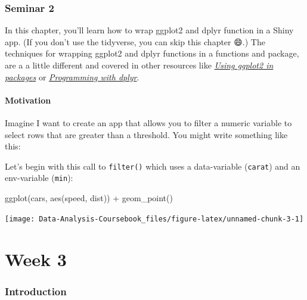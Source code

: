 \documentclass[
]{article}
\newenvironment{Shaded}{\begin{snugshade}}{\end{snugshade}}
\newcommand{\FunctionTok}[1]{\textcolor[rgb]{0.00,0.00,0.00}{#1}}
\newcommand{\NormalTok}[1]{#1}
\newcommand{\SpecialCharTok}[1]{\textcolor[rgb]{0.00,0.00,0.00}{#1}}
\begin{document}
\hypertarget{seminar2}{%
\section{Seminar 2}\label{seminar2}}

In this chapter, you'll learn how to wrap ggplot2 and dplyr function in a Shiny app.
(If you don't use the tidyverse, you can skip this chapter 😄.) The techniques for wrapping ggplot2 and dplyr functions in a functions and package, are a a little different and covered in other resources like \href{http://ggplot2.tidyverse.org/dev/articles/ggplot2-in-packages.html}{\emph{Using ggplot2 in packages}} or \href{http://dplyr.tidyverse.org/articles/programming.html}{\emph{Programming with dplyr}}.

\hypertarget{tidy-motivation}{%
\subsection{Motivation}\label{tidy-motivation}}

Imagine I want to create an app that allows you to filter a numeric variable to select rows that are greater than a threshold.
You might write something like this:

Let's begin with this call to \texttt{filter()} which uses a data-variable (\texttt{carat}) and an env-variable (\texttt{min}):

\begin{Shaded}
\begin{Highlighting}[]
\FunctionTok{ggplot}\NormalTok{(cars, }\FunctionTok{aes}\NormalTok{(speed, dist)) }\SpecialCharTok{+} 
  \FunctionTok{geom\_point}\NormalTok{()}
\end{Highlighting}
\end{Shaded}

\begin{center}\texttt{[image: Data-Analysis-Coursebook\_files/figure-latex/unnamed-chunk-3-1]} \end{center}

\hypertarget{part-week-3}{%
\part*{Week 3}\label{part-week-3}}

\hypertarget{week3-intro}{%
\section*{Introduction}\label{week3-intro}}
\end{document}

